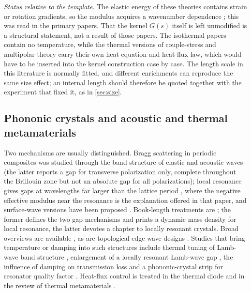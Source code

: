 \emph{Status relative to the template.} The elastic energy of these theories contains strain or rotation gradients, so the modulus acquires a wavenumber dependence \cite{Toupin1962,Mindlin1964,Mindlin1965}; this was read in the primary papers. That the kernel $G(s)$ itself is left unmodified is a structural statement, not a result of those papers. The isothermal papers contain no temperature, while the thermal versions of couple-stress and multipolar theory \cite{Toupin1962,GreenRivlin1964} carry their own heat equation and heat-flux law, which would have to be inserted into the kernel construction case by case. The length scale in this literature is normally fitted, and different enrichments can reproduce the same size effect; an internal length should therefore be quoted together with the experiment that fixed it, as in \cref{sec:size}.

\subsection{Phononic crystals and acoustic and thermal metamaterials}
Two mechanisms are usually distinguished. Bragg scattering in periodic composites was studied through the band structure of elastic and acoustic waves \cite{Sigalas1992,Kushwaha1993} (the latter reports a gap for transverse polarization only, complete throughout the Brillouin zone but not an absolute gap for all polarizations); local resonance gives gaps at wavelengths far larger than the lattice period \cite{Liu2000}, where the negative effective modulus near the resonance is the explanation offered in that paper, and surface-wave versions have been proposed \cite{Khelif2010}. Book-length treatments are \cite{Deymier2013,Laude2015}; the former defines the two gap mechanisms and prints a dynamic mass density for local resonance, the latter devotes a chapter to locally resonant crystals. Broad overviews are available \cite{Lu2009,Hussein2014,Christensen2015,Cummer2016,Ma2016,Vasileiadis2021,Cang2022}, as are topological edge-wave designs \cite{Wang2015Topo}. Studies that bring temperature or damping into such structures include thermal tuning of Lamb-wave band structure \cite{Yao2011}, enlargement of a locally resonant Lamb-wave gap \cite{Hu2014}, the influence of damping on transmission loss \cite{VanBelle2019} and a phononic-crystal strip for resonator quality factor \cite{Ha2022}. Heat-flux control is treated in the thermal diode \cite{Li2004Diode} and in the review of thermal metamaterials \cite{Li2021Thermal}.

